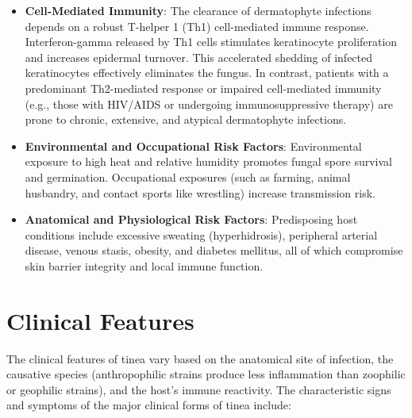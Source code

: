 \begin{itemize}
    \item \textbf{Cell-Mediated Immunity}: The clearance of dermatophyte infections depends on a robust T-helper 1 (Th1) cell-mediated immune response. Interferon-gamma released by Th1 cells stimulates keratinocyte proliferation and increases epidermal turnover. This accelerated shedding of infected keratinocytes effectively eliminates the fungus. In contrast, patients with a predominant Th2-mediated response or impaired cell-mediated immunity (e.g., those with HIV/AIDS or undergoing immunosuppressive therapy) are prone to chronic, extensive, and atypical dermatophyte infections.
    \item \textbf{Environmental and Occupational Risk Factors}: Environmental exposure to high heat and relative humidity promotes fungal spore survival and germination. Occupational exposures (such as farming, animal husbandry, and contact sports like wrestling) increase transmission risk.
    \item \textbf{Anatomical and Physiological Risk Factors}: Predisposing host conditions include excessive sweating (hyperhidrosis), peripheral arterial disease, venous stasis, obesity, and diabetes mellitus, all of which compromise skin barrier integrity and local immune function.
\end{itemize}

\section*{Clinical Features}
The clinical features of tinea vary based on the anatomical site of infection, the causative species (anthropophilic strains produce less inflammation than zoophilic or geophilic strains), and the host's immune reactivity. The characteristic signs and symptoms of the major clinical forms of tinea include:

